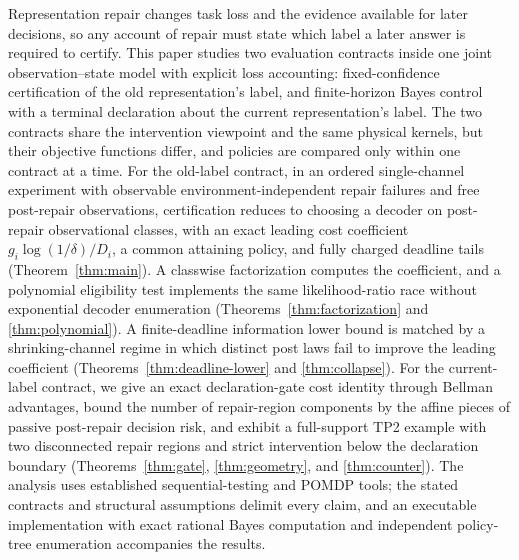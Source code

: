 Representation repair changes task loss and the evidence available for later decisions, so any account of repair must state which label a later answer is required to certify. This paper studies two evaluation contracts inside one joint observation--state model with explicit loss accounting: fixed-confidence certification of the old representation's label, and finite-horizon Bayes control with a terminal declaration about the current representation's label. The two contracts share the intervention viewpoint and the same physical kernels, but their objective functions differ, and policies are compared only within one contract at a time. For the old-label contract, in an ordered single-channel experiment with observable environment-independent repair failures and free post-repair observations, certification reduces to choosing a decoder on post-repair observational classes, with an exact leading cost coefficient $g_i\log(1/\delta)/D_i$, a common attaining policy, and fully charged deadline tails (Theorem~\ref{thm:main}). A classwise factorization computes the coefficient, and a polynomial eligibility test implements the same likelihood-ratio race without exponential decoder enumeration (Theorems~\ref{thm:factorization} and \ref{thm:polynomial}). A finite-deadline information lower bound is matched by a shrinking-channel regime in which distinct post laws fail to improve the leading coefficient (Theorems~\ref{thm:deadline-lower} and \ref{thm:collapse}). For the current-label contract, we give an exact declaration-gate cost identity through Bellman advantages, bound the number of repair-region components by the affine pieces of passive post-repair decision risk, and exhibit a full-support TP2 example with two disconnected repair regions and strict intervention below the declaration boundary (Theorems~\ref{thm:gate}, \ref{thm:geometry}, and \ref{thm:counter}). The analysis uses established sequential-testing and POMDP tools; the stated contracts and structural assumptions delimit every claim, and an executable implementation with exact rational Bayes computation and independent policy-tree enumeration accompanies the results.